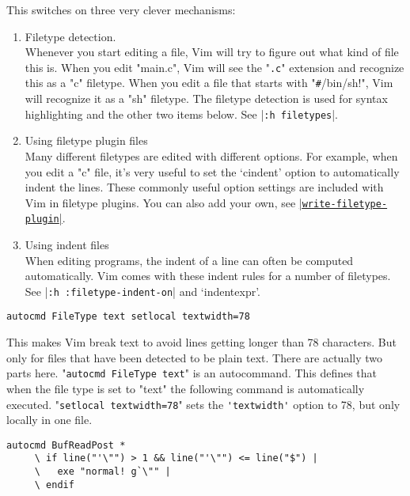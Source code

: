 This switches on three very clever mechanisms:
\begin{enumerate}
				\item Filetype detection.\\
								Whenever you start editing a file, Vim will try to figure out what kind of file this is.
								When you edit "main.c", Vim will see the "\verb!.c!" extension and recognize this as a "c" filetype.
								When you edit a file that starts with "\verb!#!/bin/sh!", Vim will recognize it as a "sh" filetype.
								The filetype detection is used for syntax highlighting and the other two items below.
								See |\verb!:h filetypes!|.

				\item Using filetype plugin files\\
								Many different filetypes are edited with different options.
								For example, when you edit a "c" file, it's very useful to set the `cindent' option to automatically indent the lines.
								These commonly useful option settings are included with Vim in filetype plugins.
								You can also add your own, see \hyperref[write-filetype-plugin]{|\texttt{write-filetype-plugin}|}.

				\item Using indent files\\
								When editing programs, the indent of a line can often be computed automatically.
								Vim comes with these indent rules for a number of filetypes.
								See |\verb!:h :filetype-indent-on!| and `indentexpr'.
\end{enumerate}

 \begin{Verbatim}[samepage=true]
 autocmd FileType text setlocal textwidth=78
 \end{Verbatim}

This makes Vim break text to avoid lines getting longer than 78 characters.
But only for files that have been detected to be plain text.
There are actually two parts here.
"\verb!autocmd FileType text!" is an autocommand.
This defines that when the file type is set to "text" the following command is automatically executed.
"\verb!setlocal textwidth=78!" sets the \verb!'textwidth'! option to 78, but only locally in one file.

\label{restore-cursor}

\begin{Verbatim}[samepage=true]
 autocmd BufReadPost *
     \ if line("'\"") > 1 && line("'\"") <= line("$") |
     \   exe "normal! g`\"" |
     \ endif
\end{Verbatim}

